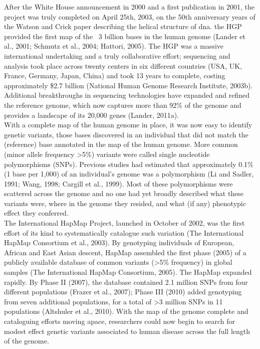 After the White House announcement in 2000 and a first publication in 2001, the 
project was truly completed on April 25th, 2003, on the 50th anniversary years of the Watson and Crick paper describing the helical structure of \gls{dna}.
the HGP provided the first map of the ~3 billion bases in the human genome (Lander et al., 2001; Schmutz et al., 2004; Hattori, 2005). 
The HGP was a massive international undertaking and a truly collaborative effort; sequencing and analysis took place across twenty centers in six different countries (USA, UK, France, Germany, Japan, China) and took 13 years to complete, costing approximately \$2.7 billion (National Human Genome Research Institute, 2003b).\\ 

Additional breakthroughs in sequencing technologies have expanded and refined the reference genome, which now captures more than 92\% of the genome and provides a landscape of its 20,000 genes (Lander, 2011a).\\

With a complete map of the human genome in place, it was now easy to identify genetic
variants, those bases discovered in an individual that did not match the (reference) base
annotated in the map of the human genome. More common (minor allele frequency >5\%) variants were called single nucleotide polymorphisms (SNPs). 
Previous studies had estimated that approximately 0.1\% (1 base per 1,000) of an individual's genome was a polymorphism (Li and Sadler, 1991; Wang, 1998; Cargill et al., 1999). 
Most of these polymorphisms were scattered across the genome and no one had yet broadly described what these variants were, where in the genome they resided, and what (if any) phenotypic effect they conferred.\\

The International HapMap Project, launched in October of 2002, was the first effort of its
kind to systematically catalogue such variation (The International HapMap Consortium et al., 2003). 
By genotyping individuals of European, African and East Asian descent, HapMap assembled the first phase (2005) of a publicly available database of common variants (>5\% frequency) in global samples (The International HapMap Consortium, 2005). 
The HapMap expanded rapidly. 
By Phase II (2007), the database contained 2.1 million SNPs from four different populations (Frazer et al., 2007); Phase III (2010) added genotyping from seven additional populations, for a total of >3 million SNPs in 11 populations (Altshuler et al., 2010). 
With the map of the genome complete and cataloguing efforts moving apace, researchers could now begin to search for modest effect genetic variants associated to human disease across the full length of the genome.

